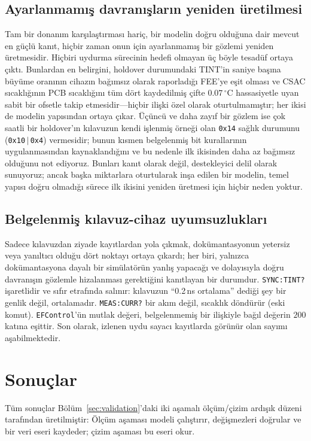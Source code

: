 \documentclass[9pt,twocolumn,a4paper]{extarticle}
\begin{document}
\subsection{Ayarlanmamış davranışların yeniden üretilmesi}
Tam bir donanım karşılaştırması hariç, bir modelin doğru olduğuna dair mevcut en güçlü kanıt, hiçbir zaman onun için ayarlanmamış bir gözlemi yeniden üretmesidir. Hiçbiri uydurma sürecinin hedefi olmayan üç böyle tesadüf ortaya çıktı. Bunlardan en belirgini, holdover durumundaki TINT'in saniye başına büyüme oranının cihazın bağımsız olarak raporladığı FEE'ye eşit olması ve CSAC sıcaklığının PCB sıcaklığını tüm dört kaydedilmiş çifte $0.07\,^\circ$C hassasiyetle uyan sabit bir ofsetle takip etmesidir---hiçbir ilişki özel olarak oturtulmamıştır; her ikisi de modelin yapısından ortaya çıkar. Üçüncü ve daha zayıf bir gözlem ise çok saatli bir holdover'ın kılavuzun kendi işlenmiş örneği olan \texttt{0x14} sağlık durumunu (\texttt{0x10}\,$\vert$\,\texttt{0x4}) vermesidir; bunun kısmen belgelenmiş bit kurallarının uygulanmasından kaynaklandığını ve bu nedenle ilk ikisinden daha az bağımsız olduğunu not ediyoruz. Bunları kanıt olarak değil, destekleyici delil olarak sunuyoruz; ancak başka miktarlara oturtularak inşa edilen bir modelin, temel yapısı doğru olmadığı sürece ilk ikisini yeniden üretmesi için hiçbir neden yoktur.

\subsection{Belgelenmiş kılavuz-cihaz uyumsuzlukları}
Sadece kılavuzdan ziyade kayıtlardan yola çıkmak, dokümantasyonun yetersiz veya yanıltıcı olduğu dört noktayı ortaya çıkardı; her biri, yalnızca dokümantasyona dayalı bir simülatörün yanlış yapacağı ve dolayısıyla doğru davranışın gözlemle hizalanması gerektiğini kanıtlayan bir durumdur. \texttt{SYNC:TINT?} işaretlidir ve sıfır etrafında salınır: kılavuzun ``0.2\,ns ortalama'' dediği şey bir genlik değil, ortalamadır. \texttt{MEAS:CURR?} bir akım değil, sıcaklık döndürür (eski komut). \texttt{EFControl}'ün mutlak değeri, belgelenmemiş bir ilişkiyle bağıl değerin $200$ katına eşittir. Son olarak, izlenen uydu sayacı kayıtlarda görünür olan sayımı aşabilmektedir.

\section{Sonuçlar}
\label{sec:results}
Tüm sonuçlar Bölüm~\ref{sec:validation}'daki iki aşamalı ölçüm/çizim ardışık düzeni tarafından üretilmiştir: Ölçüm aşaması modeli çalıştırır, değişmezleri doğrular ve bir veri eseri kaydeder; çizim aşaması bu eseri okur.
\end{document}
